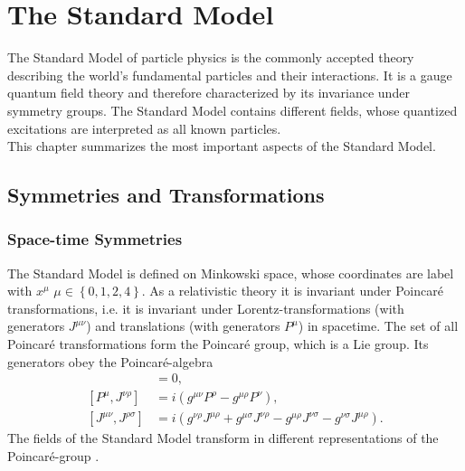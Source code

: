 \section{The Standard Model}
The Standard Model of particle physics is the commonly accepted theory describing the world's fundamental particles and their interactions. It is a gauge quantum field theory and therefore characterized by its invariance under symmetry groups. The Standard Model contains different fields, whose quantized excitations are interpreted as all known particles.\\
This chapter summarizes the most important aspects of the Standard Model.


\subsection{Symmetries and Transformations}
\subsubsection*{Space-time Symmetries}
The Standard Model is defined on Minkowski space, whose coordinates are label with $x^\mu$ $\mu \in \left\{0,1,2,4\right\}$. As a relativistic theory it is invariant under Poincaré transformations, i.e. it is invariant under Lorentz-transformations (with generators $J^{\mu\nu}$) and translations (with generators $P^\mu$) in spacetime. The set of all Poincaré transformations form the Poincaré group, which is a Lie group. Its generators obey the Poincaré-algebra
\begin{align}
[P^\mu,P^\nu] &= 0,\nonumber\\
[P^\mu,J^{\nu\rho}] &= i(g^{\mu\nu} P^\rho - g^{\mu\rho}P^\nu),\nonumber\\
[J^{\mu\nu},J^{\rho\sigma}] &= i(g^{\nu\rho}J^{\mu\rho} + g^{\mu\sigma}J^{\nu\rho} - g^{\mu\rho}J^{\nu\sigma} - g^{\nu\sigma}J^{\mu\rho}).\label{eq:PoincareAlgebra}
\end{align}
The fields of the Standard Model transform in different representations of the Poincaré-group \cite{book:17018}. 


